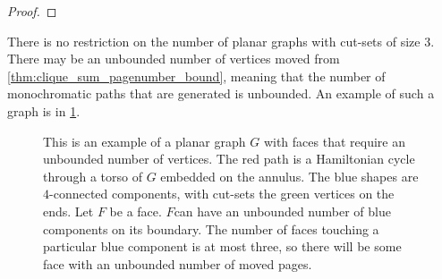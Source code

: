 \begin{proof}
\end{proof}	
There is no restriction on the number of planar graphs with cut-sets of size $3$.  There may be an unbounded number of vertices moved from \cref{thm:clique_sum_pagenumber_bound}, meaning that the number of monochromatic paths that are generated is unbounded. An example of such a graph is in \cref{fig:moved_vertices}.




\begin{figure}[h!]
	\centering
	
	\caption[Counterexample to bounded number of moved vertices]{This is an example of a planar graph $G$ with faces that require an unbounded number of vertices. The red path is a Hamiltonian cycle through a torso of $G$ embedded on the annulus. The blue shapes are $4$-connected components, with cut-sets the green vertices on the ends. Let $F$ be a face. $F$can have an unbounded number of blue components on its boundary. The number of faces touching a particular blue component is at most three, so there will be some face with an unbounded number of moved pages.}\label{fig:moved_vertices}
\end{figure}